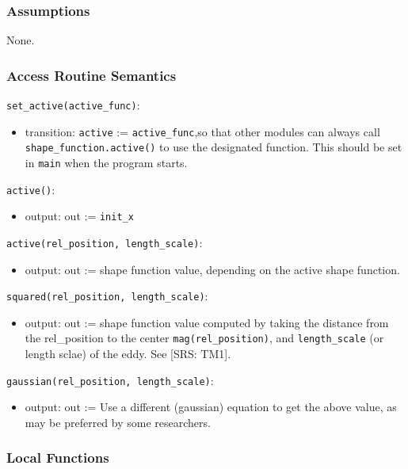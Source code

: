 \documentclass[12pt, titlepage]{article}
\begin{document}
\subsubsection{Assumptions}
None.

\subsubsection{Access Routine Semantics}

\noindent \texttt{set\_active(active\_func)}:
\begin{itemize}
\item transition: \texttt{active} := \texttt{active\_func},\newline so that other modules can always call \texttt{shape\_function.active()} to use the designated function. This should be set in \texttt{main} when the program starts.
\end{itemize}

\noindent \texttt{active()}:
\begin{itemize}
  \item output: out := \texttt{init\_x}
\end{itemize}

\noindent \texttt{active(rel\_position, length\_scale)}:
\begin{itemize}
  \item output: out := shape function value, depending on the active shape function.
\end{itemize}

\noindent \texttt{squared(rel\_position, length\_scale)}:
\begin{itemize}
  \item output: out := shape function value computed by taking the distance from the rel\_position to the center \texttt{mag(rel\_position)}, and \texttt{length\_scale} (or length sclae) of the eddy. See [SRS: TM1].
\end{itemize}

\noindent \texttt{gaussian(rel\_position, length\_scale)}:
\begin{itemize}
  \item output: out := Use a different (gaussian) equation to get the above value, as may be preferred by some researchers.
\end{itemize}

\subsubsection{Local Functions}
\end{document}
